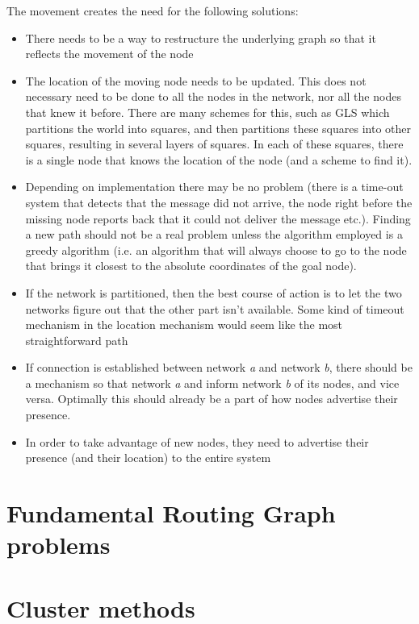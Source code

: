\documentclass[letter, 12pt, english, draft]{article}
\begin{document}
The movement creates the need for the following solutions:
\begin{itemize}
\item There needs to be a way to restructure the underlying graph so that it reflects the movement of the node \cite{practical}
\item The location of the moving node needs to be updated. This does not necessary need to be done to all the nodes in the network, nor all the nodes that knew it before. There are many schemes for this, such as GLS \cite{scaleLocation} which partitions the world into squares, and then partitions these squares into other squares, resulting in several layers of squares. In each of these squares, there is a single node that knows the location of the node (and a scheme to find it).
\item Depending on implementation there may be no problem (there is a time-out system that detects that the message did not arrive, the node right before the missing node reports back that it could not deliver the message etc.). Finding a new path should not be a real problem unless the algorithm employed is a greedy algorithm (i.e. an algorithm that will always choose to go to the node that brings it closest to the absolute coordinates of the goal node).
\item If the network is partitioned, then the best course of action is to let the two networks figure out that the other part isn't available. Some kind of timeout mechanism in the location mechanism would seem like the most straightforward path
\item If connection is established between network \emph{a} and network \emph{b}, there should be a mechanism so that network \emph{a} and inform network \emph{b} of its nodes, and vice versa. Optimally this should already be a part of how nodes advertise their presence.
\item In order to take advantage of new nodes, they need to advertise their presence (and their location) to the entire system 
\end{itemize}

\section{Fundamental Routing Graph problems}


\section{Cluster methods}


{}
\end{document}
